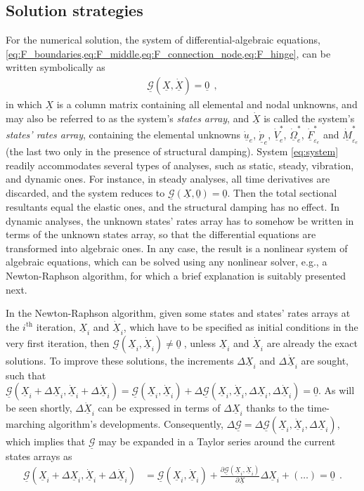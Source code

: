 \documentclass[12pt,a4paper,oneside,english]{abntex2} %
\newcommand{\fix}[1]{{\color{red}#1}}
\newcommand{\vect}[1]{\underline{#1}}
\newcommand{\del}[2]{\frac{\partial#1}{\partial#2}}
\def\lp{\left(}
\def\rp{\right)}
\def\u{\vect{u}}
\def\udot{\dot{\u}}
\def\V{\vect{V}}
\def\Om{\vect{\Omega}}
\def\p{\vect{p}}
\def\pdot{\dot{\p}}
\def\F{\vect{F}}
\def\M{\vect{M}}
\def\zv{\vect{0}}
\def\udote{\udot_e}
\def\pdote{\pdot_e}
\def\Vsdote{\dot{\V}_e^*}
\def\Omsdote{\dot{\Om}_e^*}
\def\Fsepsdote{\dot{\F}^*_{\varepsilon_e}}
\def\Msepsdote{\dot{\M}^*_{\varepsilon_e}}
\def\Sys{\mathcal{\vect{G}}}
\def\X{\vect{X}}
\def\Xi{\X_i}
\def\Xdot{\dot{\X}}
\def\Xdoti{\dot{\X}_i}
\begin{document}
\subsection{Solution strategies}
\label{sec:fem_solution}

For the numerical solution, the system of differential-algebraic equations, \cref{eq:F_boundaries,eq:F_middle,eq:F_connection_node,eq:F_hinge}, can be written symbolically as
\begin{align}
    \Sys\lp\X,\Xdot\rp = \zv \ \ ,
    \label{eq:system}
\end{align}
in which $\X$ is a column matrix containing all elemental and nodal unknowns, and may also be referred to as the system's \textit{states array}, and $\Xdot$ is called the system's \textit{states' rates array}, containing the elemental unknowns $\udote$, $\pdote$, $\Vsdote$\fix{, $\Omsdote$, $\Fsepsdote$ and $\Msepsdote$ (the last two only in the presence of structural damping)}. System \eqref{eq:system} readily accommodates several types of analyses, such as static, steady, vibration, and dynamic ones. For instance, in steady analyses, all time derivatives are discarded, and the system reduces to $\Sys\lp\X,\zv\rp = \zv$. \fix{Then the total sectional resultants equal the elastic ones, and the structural damping has no effect.} In dynamic analyses, the unknown states' rates array has to somehow be written in terms of the unknown states array, so that the differential equations are transformed into algebraic ones. In any case, the result is a nonlinear system of algebraic equations, which can be solved using any nonlinear solver, e.g., a Newton-Raphson algorithm, for which a brief explanation is suitably presented next.

In the Newton-Raphson algorithm, given some states and states' rates arrays at the $i^{\text{th}}$ iteration, $\Xi$ and $\Xdoti$, which have to be specified as initial conditions in the very first iteration, then $\Sys\lp\Xi,\Xdoti\rp \neq \zv\;$, unless $\Xi$ and $\Xdoti$ are already the exact solutions. To improve these solutions, the increments $\Delta\Xi$ and $\Delta\Xdoti$ are sought, such that $\Sys\lp\Xi+\Delta\Xi,\Xdoti+\Delta\Xdoti\rp = \Sys\lp\Xi,\Xdoti\rp + \Delta\Sys(\Xi,\Xdoti,\Delta\Xi,\Delta\Xdoti) = \zv$. As will be seen shortly, $\Delta\Xdoti$ can be expressed in terms of $\Delta\Xi$ thanks to the time-marching algorithm's developments. Consequently, $\Delta\Sys = \Delta\Sys(\Xi,\Xdoti,\Delta\Xi)$, which implies that $\Sys$ may be expanded in a Taylor series around the current states arrays as
\begin{align}
    \Sys\lp\Xi+\Delta\Xi,\Xdoti+\Delta\Xdoti\rp &= \Sys\lp\Xi,\Xdoti\rp + \del{\Sys\lp\Xi,\Xdoti\rp}{\X}\Delta\Xi + \lp\ldots\rp = \zv \ \ .
    \label{eq:sys_Taylor}
\end{align}
\end{document}

